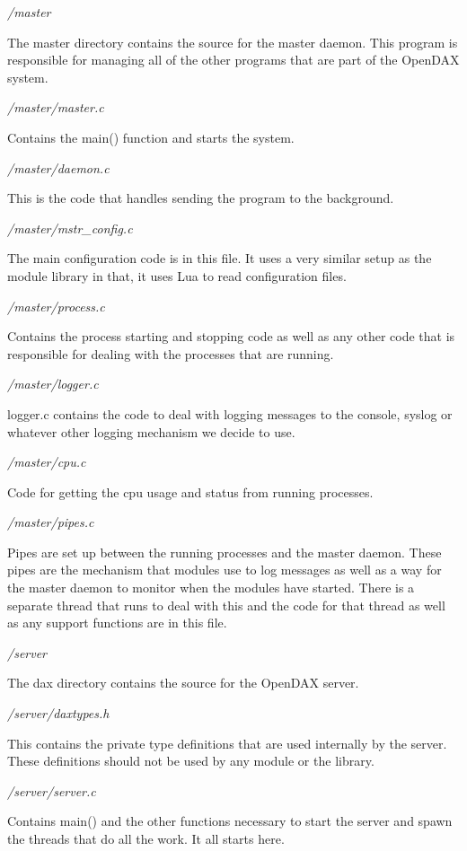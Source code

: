 \emph{/master}

The master directory contains the source for the master daemon.  This program is responsible for managing all of the other programs that are part of the OpenDAX system.

\emph{/master/master.c}

Contains the main() function and starts the system.

\emph{/master/daemon.c}

This is the code that handles sending the program to the background.

\emph{/master/mstr\_config.c}

The main configuration code is in this file.  It uses a very similar setup as the module library in that, it uses Lua to read configuration files.

\emph{/master/process.c}

Contains the process starting and stopping code as well as any other code that is responsible for dealing with the processes that are running.

\emph{/master/logger.c}

logger.c contains the code to deal with logging messages to the console, syslog or whatever other logging mechanism we decide to use.

\emph{/master/cpu.c}

Code for getting the cpu usage and status from running processes.

\emph{/master/pipes.c}

Pipes are set up between the running processes and the master daemon.  These pipes are the mechanism that modules use to log messages as well as a way for the master daemon to monitor when the modules have started.  There is a separate thread that runs to deal with this and the code for that thread as well as any support functions are in this file.

\emph{/server}

The dax directory contains the source for the OpenDAX server.

\emph{/server/daxtypes.h}

This contains the private type definitions that are used internally by the server. These definitions should not be used by any module or the library.

\emph{/server/server.c}

Contains main() and the other functions necessary to start the server and spawn the threads that do all the work. It all starts here.

